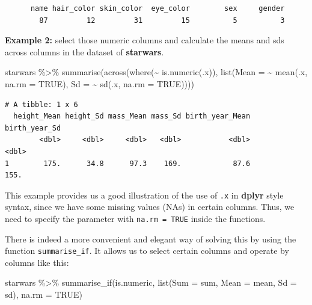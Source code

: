 \documentclass[
  letterpaper,
  DIV=11,
  numbers=noendperiod]{scrartcl}
\newenvironment{Shaded}{}{}
\newcommand{\AttributeTok}[1]{\textcolor[rgb]{0.65,0.15,0.64}{#1}}
\newcommand{\ConstantTok}[1]{\textcolor[rgb]{0.60,0.41,0.00}{#1}}
\newcommand{\FunctionTok}[1]{\textcolor[rgb]{0.25,0.47,0.95}{#1}}
\newcommand{\NormalTok}[1]{\textcolor[rgb]{0.22,0.23,0.26}{#1}}
\newcommand{\SpecialCharTok}[1]{\textcolor[rgb]{0.00,0.52,0.74}{#1}}
\begin{document}
\begin{verbatim}
      name hair_color skin_color  eye_color        sex     gender 
        87         12         31         15          5          3 
\end{verbatim}

\textbf{Example 2:} select those numeric columns and calculate the means
and sds across columns in the dataset of \textbf{starwars}.

\begin{Shaded}
\begin{Highlighting}[]
\NormalTok{starwars }\SpecialCharTok{\%\textgreater{}\%}
  \FunctionTok{summarise}\NormalTok{(}\FunctionTok{across}\NormalTok{(}\FunctionTok{where}\NormalTok{(}\SpecialCharTok{\textasciitilde{}} \FunctionTok{is.numeric}\NormalTok{(.x)),}
                   \FunctionTok{list}\NormalTok{(}\AttributeTok{Mean =} \SpecialCharTok{\textasciitilde{}} \FunctionTok{mean}\NormalTok{(.x, }\AttributeTok{na.rm =} \ConstantTok{TRUE}\NormalTok{),}
                        \AttributeTok{Sd =} \SpecialCharTok{\textasciitilde{}} \FunctionTok{sd}\NormalTok{(.x, }\AttributeTok{na.rm =} \ConstantTok{TRUE}\NormalTok{))))}
\end{Highlighting}
\end{Shaded}

\begin{verbatim}
# A tibble: 1 x 6
  height_Mean height_Sd mass_Mean mass_Sd birth_year_Mean birth_year_Sd
        <dbl>     <dbl>     <dbl>   <dbl>           <dbl>         <dbl>
1        175.      34.8      97.3    169.            87.6          155.
\end{verbatim}

This example provides us a good illustration of the use of \texttt{.x}
in \textbf{dplyr} style syntax, since we have some missing values (NAs)
in certain columns. Thus, we need to specify the parameter with
\texttt{na.rm\ =\ TRUE} inside the functions.

There is indeed a more convenient and elegant way of solving this by
using the function \texttt{summarise\_if}. It allows us to select
certain columns and operate by columns like this:

\begin{Shaded}
\begin{Highlighting}[]
\NormalTok{starwars }\SpecialCharTok{\%\textgreater{}\%}
  \FunctionTok{summarise\_if}\NormalTok{(is.numeric,}
               \FunctionTok{list}\NormalTok{(}\AttributeTok{Sum =}\NormalTok{ sum, }\AttributeTok{Mean =}\NormalTok{ mean, }\AttributeTok{Sd =}\NormalTok{ sd),}
               \AttributeTok{na.rm =} \ConstantTok{TRUE}\NormalTok{)}
\end{Highlighting}
\end{Shaded}
\end{document}

